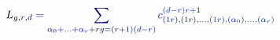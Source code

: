 \documentclass[12pt]{article}
\begin{document}
\makeatletter
\renewcommand*{\@textcolor}[3]{%
  \protect\leavevmode
  \begingroup
    \color#1{#2}#3%
  \endgroup
}
\makeatother
\begin{displaymath}
\mathcolor[RGB]{0,0,15}{L} _ { \mathcolor[RGB]{0,0,30}{g} \mathcolor[RGB]{0,0,45}{,} \mathcolor[RGB]{0,0,60}{r} \mathcolor[RGB]{0,0,75}{,} \mathcolor[RGB]{0,0,90}{d} } \mathcolor[RGB]{0,0,105}{=} \mathcolor[RGB]{0,0,120}{\sum} _ { \mathcolor[RGB]{0,0,135}{\alpha} _ { \mathcolor[RGB]{0,0,150}{0} } \mathcolor[RGB]{0,0,165}{+} \mathcolor[RGB]{0,0,180}{.} \mathcolor[RGB]{0,0,195}{.} \mathcolor[RGB]{0,0,210}{.} \mathcolor[RGB]{0,0,225}{+} \mathcolor[RGB]{0,0,240}{\alpha} _ { \mathcolor[RGB]{0,0,255}{r} } \mathcolor[RGB]{0,15,0}{+} \mathcolor[RGB]{0,15,15}{r} \mathcolor[RGB]{0,15,30}{g} \mathcolor[RGB]{0,15,45}{=} \mathcolor[RGB]{0,15,60}{(} \mathcolor[RGB]{0,15,75}{r} \mathcolor[RGB]{0,15,90}{+} \mathcolor[RGB]{0,15,105}{1} \mathcolor[RGB]{0,15,120}{)} \mathcolor[RGB]{0,15,135}{(} \mathcolor[RGB]{0,15,150}{d} \mathcolor[RGB]{0,15,165}{-} \mathcolor[RGB]{0,15,180}{r} \mathcolor[RGB]{0,15,195}{)} } \mathcolor[RGB]{0,15,210}{c} _ { \mathcolor[RGB]{0,15,225}{(} \mathcolor[RGB]{0,15,240}{1} \mathcolor[RGB]{0,15,255}{r} \mathcolor[RGB]{0,30,0}{)} \mathcolor[RGB]{0,30,15}{,} \mathcolor[RGB]{0,30,30}{(} \mathcolor[RGB]{0,30,45}{1} \mathcolor[RGB]{0,30,60}{r} \mathcolor[RGB]{0,30,75}{)} \mathcolor[RGB]{0,30,90}{,} \mathcolor[RGB]{0,30,105}{.} \mathcolor[RGB]{0,30,120}{.} \mathcolor[RGB]{0,30,135}{.} \mathcolor[RGB]{0,30,150}{,} \mathcolor[RGB]{0,30,165}{(} \mathcolor[RGB]{0,30,180}{1} \mathcolor[RGB]{0,30,195}{r} \mathcolor[RGB]{0,30,210}{)} \mathcolor[RGB]{0,30,225}{,} \mathcolor[RGB]{0,30,240}{(} \mathcolor[RGB]{0,30,255}{\alpha} _ { \mathcolor[RGB]{0,45,0}{0} } \mathcolor[RGB]{0,45,15}{)} \mathcolor[RGB]{0,45,30}{,} \mathcolor[RGB]{0,45,45}{.} \mathcolor[RGB]{0,45,60}{.} \mathcolor[RGB]{0,45,75}{.} \mathcolor[RGB]{0,45,90}{,} \mathcolor[RGB]{0,45,105}{(} \mathcolor[RGB]{0,45,120}{\alpha} _ { \mathcolor[RGB]{0,45,135}{r} } \mathcolor[RGB]{0,45,150}{)} } ^ { \mathcolor[RGB]{0,45,165}{(} \mathcolor[RGB]{0,45,180}{d} \mathcolor[RGB]{0,45,195}{-} \mathcolor[RGB]{0,45,210}{r} \mathcolor[RGB]{0,45,225}{)} \mathcolor[RGB]{0,45,240}{r} \mathcolor[RGB]{0,45,255}{+} \mathcolor[RGB]{0,60,0}{1} }
\end{displaymath}
\end{document}

